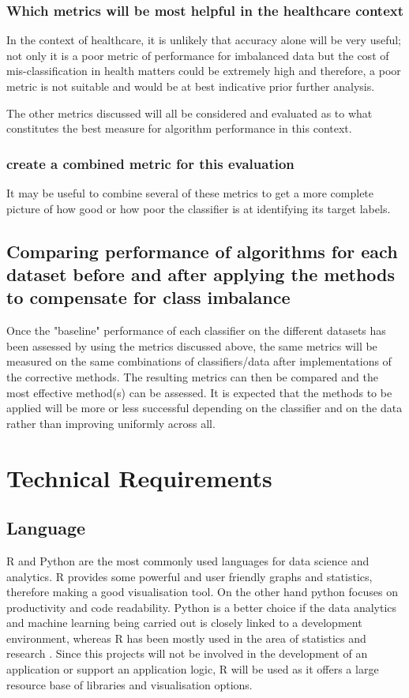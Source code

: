 \subsubsection{Which metrics will be most helpful in the healthcare context}
In the context of healthcare, it is unlikely that accuracy alone will be very useful; not only it is a poor metric of performance for imbalanced data but the cost of mis-classification in health matters could be extremely high and therefore, a poor metric is not suitable and would be at best indicative prior further analysis.

The other metrics discussed will all be considered and evaluated as to what constitutes the best measure for algorithm performance in this context.

\subsubsection{create a combined metric for this evaluation}
It may be useful to combine several of these metrics to get a more complete picture of how good or how poor the classifier is at identifying its target labels.

\subsection{Comparing performance of algorithms for each dataset before and after applying the methods to compensate for class imbalance}
Once the "baseline" performance of each classifier on the different datasets has been assessed by using the metrics discussed above, the same metrics will be measured on the same combinations of classifiers/data after implementations of the corrective methods. 
The resulting metrics can then be compared and the most effective method(s) can be assessed. It is expected that the methods to be applied will be more or less successful depending on the classifier and on the data rather than improving uniformly across all.

\section{Technical Requirements}
\subsection{Language}
R and Python are the most commonly used languages for data science and analytics. R provides some powerful and user friendly graphs and statistics, therefore making a good visualisation tool. On the other hand python focuses on productivity and code readability.
Python is a better choice if the data analytics and machine learning being carried out is closely linked to a development environment, whereas R has been mostly used in the area of statistics and research \citep{Willems:2015wi}.
Since this projects will not be involved in the development of an application or support an application logic, R will be used as it offers a large resource base of libraries and visualisation options.

